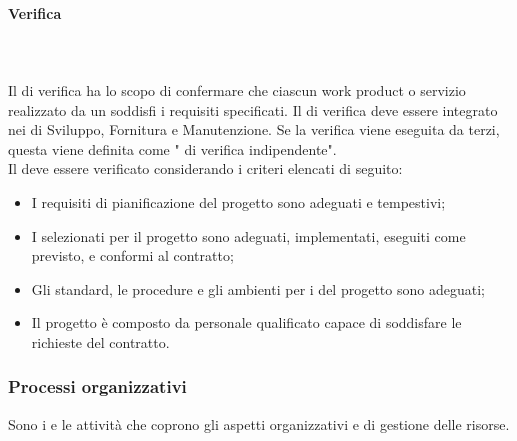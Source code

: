 \paragraph{Verifica}\mbox{}\\ \\
Il  di verifica ha lo scopo di confermare che ciascun work product o servizio realizzato da un  soddisfi i requisiti specificati. 
Il  di verifica deve essere integrato nei  di Sviluppo, Fornitura e Manutenzione. Se la verifica viene eseguita da terzi, questa viene definita come " di verifica indipendente".
\\
Il  deve essere verificato considerando i criteri elencati di seguito:
\begin{itemize}
    \item I requisiti di pianificazione del progetto sono adeguati e tempestivi;
    \item I  selezionati per il progetto sono adeguati, implementati, eseguiti come previsto, e conformi al contratto;
    \item Gli standard, le procedure e gli ambienti per i  del progetto sono adeguati;
    \item Il progetto è composto da personale qualificato capace di soddisfare le richieste del contratto.
\end{itemize}

\subsubsection{Processi organizzativi}
Sono i  e le attività che coprono gli aspetti organizzativi e di gestione delle risorse.

